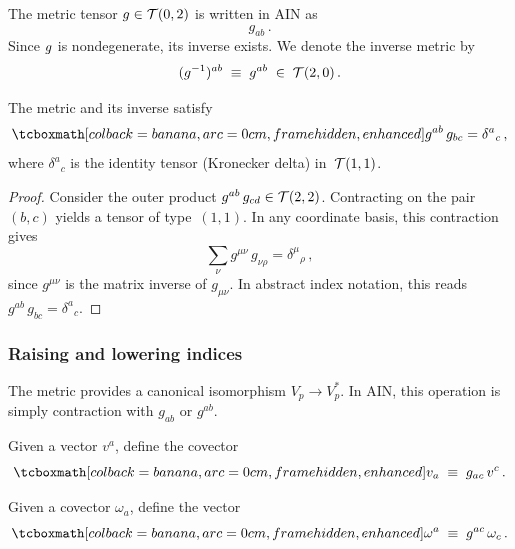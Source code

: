 The metric tensor $g\in\mathcal{T}(0,2)$ is written in AIN as
\begin{equation}\label{eq:metric-ain}
  g_{ab}\,.
\end{equation}
Since $g$ is nondegenerate, its inverse exists.  We denote
the inverse metric by
\begin{equation}\label{eq:inverse-metric-ain}
  (g^{-1})^{ab} \;\equiv\; g^{ab} \;\in\; \mathcal{T}(2,0)\,.
\end{equation}

\begin{lemma}\label{lem:metric-inverse-identity}
  The metric and its inverse satisfy
  \begin{equation}\label{eq:metric-inverse-contraction}
    \eqbox{g^{ab}\, g_{bc} = \delta^a{}_c}\,,
  \end{equation}
  where $\delta^a{}_c$ is the identity tensor (Kronecker delta)
  in~$\mathcal{T}(1,1)$.
\end{lemma}

\begin{proof}
  Consider the outer product
  $g^{ab}\,g_{cd}\in\mathcal{T}(2,2)$.  Contracting on the pair
  $(b,c)$ yields a tensor of type~$(1,1)$.  In any coordinate
  basis, this contraction gives
  \[
    \sum_\nu g^{\mu\nu}\, g_{\nu\rho}
    = \delta^\mu{}_\rho\,,
  \]
  since $g^{\mu\nu}$ is the matrix inverse of $g_{\mu\nu}$.
  In abstract index notation, this reads
  $g^{ab}\,g_{bc} = \delta^a{}_c$.
\end{proof}

\subsubsection{Raising and lowering indices}%
\label{sec:raising-lowering}

The metric provides a canonical isomorphism $V_p\to V_p^*$.
In AIN, this operation is simply contraction with $g_{ab}$ or
$g^{ab}$.

\begin{definition}\label{def:lowering}
  Given a vector $v^a$, define the covector
  \begin{equation}\label{eq:lowering}
    \eqbox{v_a \;\equiv\; g_{ac}\, v^c}\,.
  \end{equation}
\end{definition}

\begin{definition}\label{def:raising}
  Given a covector $\omega_a$, define the vector
  \begin{equation}\label{eq:raising}
    \eqbox{\omega^a \;\equiv\; g^{ac}\, \omega_c}\,.
  \end{equation}
\end{definition}

